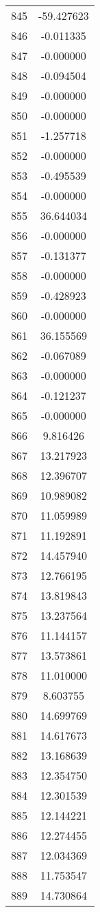 \documentclass[12pt]{article}
\begin{document}
\begin{longtable}{@{}cc@{}}
845 & -59.427623 \\
846 & -0.011335 \\
847 & -0.000000 \\
848 & -0.094504 \\
849 & -0.000000 \\
850 & -0.000000 \\
851 & -1.257718 \\
852 & -0.000000 \\
853 & -0.495539 \\
854 & -0.000000 \\
855 & 36.644034 \\
856 & -0.000000 \\
857 & -0.131377 \\
858 & -0.000000 \\
859 & -0.428923 \\
860 & -0.000000 \\
861 & 36.155569 \\
862 & -0.067089 \\
863 & -0.000000 \\
864 & -0.121237 \\
865 & -0.000000 \\
866 & 9.816426 \\
867 & 13.217923 \\
868 & 12.396707 \\
869 & 10.989082 \\
870 & 11.059989 \\
871 & 11.192891 \\
872 & 14.457940 \\
873 & 12.766195 \\
874 & 13.819843 \\
875 & 13.237564 \\
876 & 11.144157 \\
877 & 13.573861 \\
878 & 11.010000 \\
879 & 8.603755 \\
880 & 14.699769 \\
881 & 14.617673 \\
882 & 13.168639 \\
883 & 12.354750 \\
884 & 12.301539 \\
885 & 12.144221 \\
886 & 12.274455 \\
887 & 12.034369 \\
888 & 11.753547 \\
889 & 14.730864 \\

\end{longtable}
\end{document}
